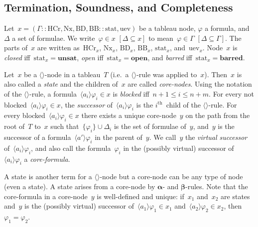 \documentclass{entcs}
\newcommand{\pea}[2]{\langle#1\rangle #2}
\newcommand{\tnode}[3]{(#1 :: #2 :: #3)}
\newcommand{\thc}{\mathrm{HCr}}
\newcommand{\tnext}{\mathrm{Nx}}
\newcommand{\tbdia}{\mathrm{BD}}
\newcommand{\tbbox}{\mathrm{BB}}
\newcommand{\tmrk}{\mathrm{stat}}
\newcommand{\tuev}{\mathrm{uev}}
\newcommand{\talpha}{\boldsymbol{\alpha}}
\newcommand{\tbeta}{\boldsymbol{\beta}}
\newcommand{\trea}{$\langle\rangle$}
\newcommand{\ttrue}{\mathbf{unsat}}
\newcommand{\tloop}{\mathbf{barred}}
\newcommand{\tfalse}{\mathbf{open}}
\begin{document}
\subsection{Termination, Soundness, and Completeness}

\begin{definition}
  Let~$x = \tnode{\Gamma}{\thc, \tnext, \tbdia, \tbbox}{\tmrk, \tuev}$ be a tableau node,
  $\varphi$ a formula, and~$\Delta$ a set of formulae.
  We write~$\varphi \in x$ $[\Delta \subseteq x]$ to mean~$\varphi \in \Gamma$ $[\Delta \subseteq \Gamma]$.
  The parts of~$x$
  are written as~$\thc_x$, $\tnext_x$, $\tbdia_x$, $\tbbox_x$, $\tmrk_x$, and~$\tuev_x$.
  Node~$x$ is \emph{closed} iff~$\tmrk_x = \ttrue$,
  \emph{open} iff~$\tmrk_x = \tfalse$, and \emph{barred} iff~$\tmrk_x = \tloop$.
\end{definition}

\begin{definition}
  Let~$x$ be a \trea{}-node in a tableau~$T$
  (i.e.\ a \trea{}-rule was applied to~$x$).
  Then~$x$ is also called a \emph{state} and
  the children of~$x$ are called \emph{core-nodes}.
  Using the notation of the \trea{}-rule,
  a formula~$\pea{a_i}{\varphi_i} \in x$ is \emph{blocked} iff~$n+1 \leq i \leq n+m$.
  For every not blocked~$\pea{a_i}{\varphi_i} \in x$,
  the \emph{successor} of~$\pea{a_i}{\varphi_i}$ is the $i^{\mathrm{th}}$~child of the \trea{}-rule.
  For every blocked~$\pea{a_i}{\varphi_i} \in x$
  there exists a unique core-node~$y$ on the path from the root of~$T$ to~$x$
  such that~$\{ \varphi_i \} \cup \Delta_i$ is the set of formulae of~$y$,
  and~$y$ is the successor of a formula~$\pea{a'}{\varphi_i}$
  in the parent of~$y$.
  We call~$y$ the \emph{virtual successor} of~$\pea{a_i}{\varphi_i}$,
  and also call the formula~$\varphi_i$ in the (possibly virtual) successor of~$\pea{a_i}{\varphi_i}$
  a \emph{core-formula}.
\end{definition}
A state is another term for a \trea{}-node
but a core-node can be any type of node
(even a state).
A state arises from a core-node
by $\talpha$- and $\tbeta$-rules.
Note that the core-formula in a core-node~$y$ is well-defined and unique:
if~$x_1$ and~$x_2$ are states
and~$y$ is the (possibly virtual) successor of~$\pea{a_1}{\varphi_1} \in x_1$ and~$\pea{a_2}{\varphi_2} \in x_2$,
then~$\varphi_1 = \varphi_2$.
\end{document}
